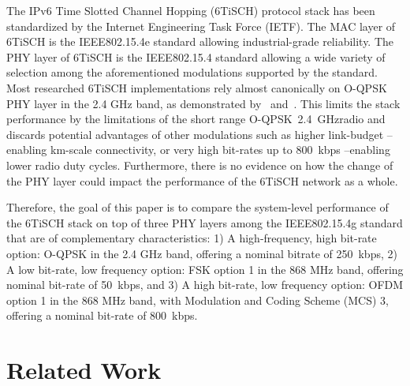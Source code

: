 \documentclass[sensors,article,submit,moreauthors,pdftex]{Definitions/mdpi}
\newcommand{\oqpsk}        {O-QPSK~2.4~GHz}
\begin{document}

The IPv6 Time Slotted Channel Hopping (6TiSCH) protocol stack has been  standardized by the Internet Engineering Task Force (IETF).
The MAC layer of 6TiSCH is the IEEE802.15.4e standard allowing industrial-grade reliability.
The PHY layer of 6TiSCH is the IEEE802.15.4 standard allowing a wide variety of selection among the aforementioned modulations supported by the standard.
Most researched 6TiSCH implementations rely almost canonically on O-QPSK PHY layer in the 2.4 GHz band, as demonstrated by~\cite{draft-munoz-6tisch-multi-phy-nodes} and~\cite{brachmann19ieee}.
This limits the stack performance by the limitations of the short range \oqpsk radio and discards potential advantages of other modulations such as higher link-budget --enabling km-scale connectivity, or very high bit-rates up to 800~kbps --enabling lower radio duty cycles.
Furthermore, there is no evidence on how the change of the PHY layer could impact the performance of the 6TiSCH network as a whole. 

Therefore, the goal of this paper is to compare the system-level performance of the 6TiSCH stack on top of three PHY layers among the IEEE802.15.4g standard that are of complementary characteristics: 
     1) A high-frequency, high bit-rate option: O-QPSK in the 2.4 GHz band, offering a nominal bitrate of 250~kbps,
     2) A low bit-rate, low frequency option: FSK option 1 in the 868 MHz band, offering nominal bit-rate of 50~kbps, and 
     3) A high bit-rate, low frequency option: OFDM option 1  in the 868 MHz band, with Modulation and Coding Scheme (MCS) 3, offering a nominal bit-rate of 800~kbps. 

\section{Related Work}
\label{sec:related_work}

\end{document}

